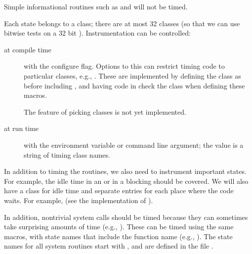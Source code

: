 \documentclass{article}
\begin{document}
Simple informational routines such as  and
 will not be timed.



Each state belongs to a class; there are at most 32 classes (so that we can use
bitwise tests on a 32 bit ).  Instrumentation can be
controlled:
\begin{description}
\item[at compile time]with the  configure flag.
 Options to this can restrict timing code to particular classes, e.g.,
 .  These are implemented by
 defining the class as  before including
 , and having code in  check the class
 when defining these macros.

The feature of picking classes is not yet implemented.

\item[at run time]with the  environment variable or
   command line argument; the value is a string of timing
  class names.
\end{description}

In addition to timing the routines, we also need to instrument important
states.  For example, the idle time in an  or in a blocking
 should be covered.  We will also have a class for idle time
and separate entries for each place where the code waits.  For example,
 (see the implementation of ).

In addition, nontrivial system calls should be timed because they can
sometimes take surprising amounts of time (e.g., ).
These can be timed using the same macros, with state names that include the
function name (e.g., ).  The state
names for all system routines start with , and
are defined in the file .
\end{document}
